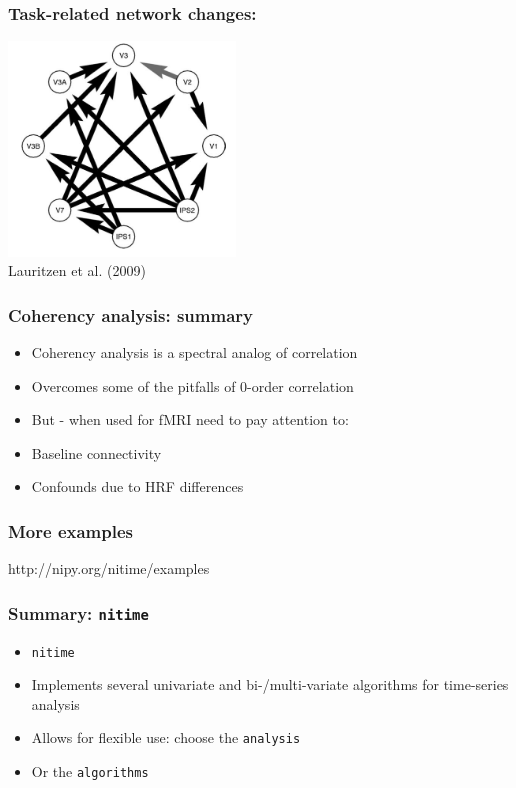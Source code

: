 \documentclass{beamer}
\begin{document}
\begin{frame}
\frametitle{Task-related network changes:}
\includegraphics[height=5.7cm]{figures/lauritzen8}
\\
\hfill 
Lauritzen et al. (2009)
\end{frame}

\begin{frame}
\frametitle{Coherency analysis: summary}
\pause
\begin{itemize}
\item
Coherency analysis is a spectral analog of correlation
\pause
\item 
Overcomes some of the pitfalls of 0-order correlation
\pause
\item
But - when used for fMRI need to pay attention to: 
\pause
\item  
Baseline connectivity
\pause
\item
Confounds due to HRF differences
\end{itemize}
\end{frame}

\begin{frame}
\frametitle{More examples}
http://nipy.org/nitime/examples
\end{frame}

\begin{frame}
\frametitle{Summary: \tt{nitime}}
\begin{itemize}
\pause
\item
\tt{nitime} 
\pause
\item
Implements several univariate and bi-/multi-variate algorithms for time-series
analysis 
\pause
\item
Allows for flexible use: choose the \tt{analysis} 
\pause
\item
Or the \tt{algorithms} 

\end{itemize}
\end{frame}
\end{document}

